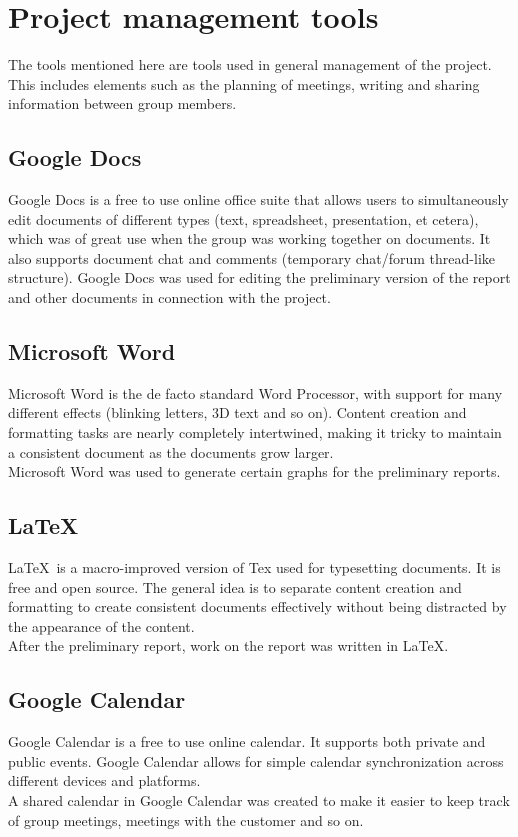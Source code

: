 \section{Project management tools}
The tools mentioned here are tools used in general management of the project. This includes elements such as the planning of meetings, writing and sharing information between group members.

\subsection{Google Docs}
Google Docs is a free to use online office suite that allows users to simultaneously edit documents of different types (text, spreadsheet, presentation, et cetera), which was of great use when the group was working together on documents. It also supports document chat and comments (temporary chat/forum thread-like structure). Google Docs was used for editing the preliminary version of the report and other documents in connection with the project.

\subsection{Microsoft Word}
Microsoft Word is the de facto standard Word Processor, with support for many different effects (blinking letters, 3D text and so on). Content creation and formatting tasks are nearly completely intertwined, making it tricky to maintain a consistent document as the documents grow larger.\\
Microsoft Word was used to generate certain graphs for the preliminary reports.

\subsection{\LaTeX}
\LaTeX ~is a macro-improved version of Tex used for typesetting documents. It is free and open source. The general idea is to separate content creation and formatting to create consistent documents effectively without being distracted by the appearance of the content.\\
After the preliminary report, work on the report was written in \LaTeX.

\subsection{Google Calendar}
Google Calendar is a free to use online calendar. It supports both private and public events. Google Calendar allows for simple calendar synchronization across different devices and platforms.\\
A shared calendar in Google Calendar was created to make it easier to keep track of group meetings, meetings with the customer and so on.

